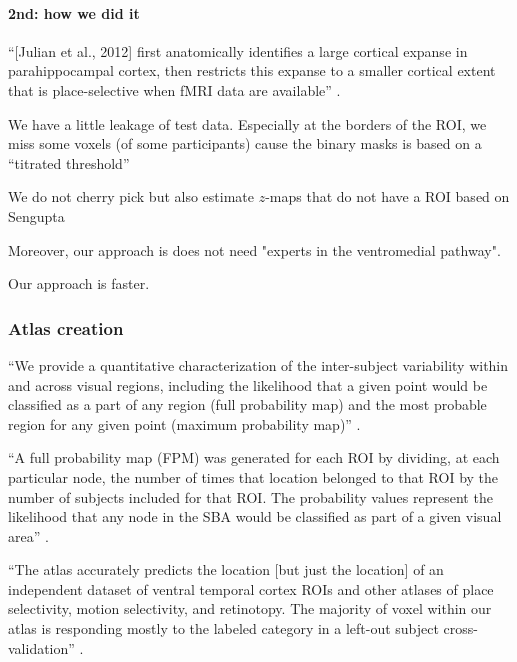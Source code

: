 \paragraph{2nd: how we did it}



%
``[Julian et al., 2012] first anatomically identifies a large cortical expanse
in parahippocampal cortex, then restricts this expanse to a smaller cortical
extent that is place-selective when fMRI data are available''
\citep{weiner2018defining}.

%
We have a little leakage of test data.
%
Especially at the borders of the ROI, we miss some voxels (of some participants)
cause the binary masks is based on a ``titrated threshold''
\citep{sengupta2016extension}

%
We do not cherry pick but also estimate $z$-maps that do not have a ROI based on
Sengupta

%
Moreover, our approach is does not need "experts in the ventromedial pathway".

%
Our approach is faster.





\subsubsection{Atlas creation}



``We provide a quantitative characterization of the inter-subject variability
within and across visual regions, including the likelihood that a given point
would be classified as a part of any region (full probability map) and the most
probable region for any given point (maximum probability map)''
\citep{wang2015probabilistic}.

``A full probability map (FPM) was generated for each ROI by dividing, at each
particular node, the number of times that location belonged to that ROI by the
number of subjects included for that ROI.
%
The probability values represent the likelihood that any node in the SBA would
be classified as part of a given visual area'' \citep{wang2015probabilistic}.



``The atlas accurately predicts the location [but just the location] of an
independent dataset of ventral temporal cortex ROIs and other atlases of place
selectivity, motion selectivity, and retinotopy.
%
The majority of voxel within our atlas is responding mostly to the labeled
category in a left-out subject cross-validation''
\citep{rosenke2021probabilistic}.

